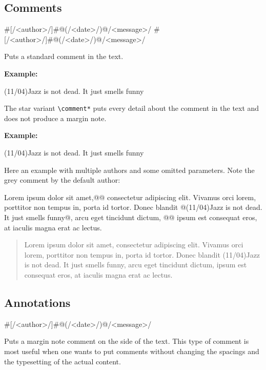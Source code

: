 \documentclass[11pt]{article}
\let\cmd=\lstinline
\def\cmdmp{\lstinline[style=mp]}
\newcommand{\doccmd}[2][]{%
	\marginpar[%
		\leavevmode%
		\raggedleft%
		\fbox{\cmdmp'#2'}%
		\scriptsize\it\ #1%
	]{%
		\leavevmode%
		\raggedright%
		\fbox{\cmdmp'#2'}%
		\scriptsize\it\ #1%
	}%
}
\begin{document}
\subsection{Comments}\doccmd{\\comment}\doccmd{\\comment*}
\begin{latex}
\comment#[/<author>/]#@(/<date>/)@{/<message>/}
\comment*#[/<author>/]#@(/<date>/)@{/<message>/}
\end{latex}
Puts a standard comment in the text.

\textbf{Example:}
\begin{latexex}
\comment[fz](11/04){Jazz is not dead. It just smells funny}
\end{latexex}
The star variant \cmd'\comment*' puts every detail about the comment in the text
and does not produce a margin note.

\textbf{Example:}
\begin{latexex}
\comment*[fz](11/04){Jazz is not dead. It just smells funny}
\end{latexex}


Here an example with multiple authors and some omitted parameters. Note the grey
comment by the default author:
\begin{latexex}
  Lorem ipsum dolor sit amet,@@
  consectetur adipiscing elit. Vivamus orci lorem,
  porttitor non tempus in, porta id tortor. Donec
  blandit @\comment[fz](11/04){Jazz is not dead.
  It just smells funny}@, arcu eget tincidunt dictum,
  @@ ipsum est
  consequat eros, at iaculis magna erat ac lectus.
\end{latexex}
\begin{quote}
	Lorem ipsum dolor sit amet, consectetur adipiscing elit.
	Vivamus orci lorem, porttitor non tempus in, porta id tortor. Donec blandit%
	\comment[fz](11/04){Jazz is not dead. It just smells funny},
	arcu eget tincidunt dictum,%
	ipsum est consequat eros, at iaculis magna erat ac
	lectus.
\end{quote}

\subsection{Annotations}\doccmd{\\annot}
\begin{latex}
\annot#[/<author>/]#@(/<date>/)@{/<message>/}
\end{latex}
Puts a margin note comment on the side of the text. This type of comment is most
useful when one wants to put comments without changing the spacings and the
typesetting of the actual content.
\end{document}
